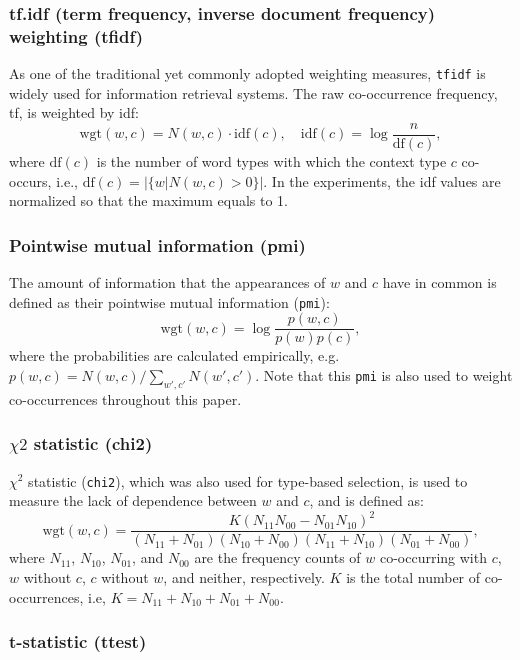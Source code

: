 \documentclass[english]{jnlp_1.4}
\begin{document}
\subsubsection{tf.idf (term frequency, inverse document frequency) weighting (tfidf)}

As one of the traditional yet commonly adopted weighting measures,
{\tt tfidf} is widely used for information retrieval systems.  The raw
co-occurrence frequency, tf, is weighted by idf:
\[
  \mbox{wgt}(w, c) = N(w, c) \cdot \mbox{idf}(c), \quad \mbox{idf}(c) = \log \frac{n}{\mbox{df}(c)},
\]
where $\mbox{df}(c)$ is the number of word types with which the
context type $c$ co-occurs, i.e., $\mbox{df}(c) = |\{ w | N(w, c) >
0\}|$. In the experiments, the idf values are normalized so that the
maximum equals to 1.

\subsubsection{Pointwise mutual information (pmi)}

The amount of information that the appearances of $w$ and $c$ have in
common is defined as their pointwise mutual information ({\tt pmi}):
\[
  \mbox{wgt}(w, c) = \log \frac{p(w,c)}{p(w)p(c)},
\]
where the probabilities are calculated empirically, e.g. $p(w, c) =
N(w, c) / \sum_{w', c'} N(w', c')$. Note that this {\tt pmi} is also
used to weight co-occurrences throughout this paper.

\subsubsection{$\chi2$ statistic (chi2)}

$\chi^2$ statistic ({\tt chi2}), which was also used for type-based
selection, is used to measure the lack of dependence between $w$ and
$c$, and is defined as:
\begin{equation}
  \mbox{wgt}(w, c) = \frac{K(N_{11}N_{00} - N_{01}N_{10})^2}{(N_{11}+N_{01})(N_{10}+N_{00})(N_{11}+N_{10})(N_{01}+N_{00})},
\end{equation}
where $N_{11}$, $N_{10}$, $N_{01}$, and $N_{00}$ are the frequency
counts of $w$ co-occurring with $c$, $w$ without $c$, $c$ without $w$,
and neither, respectively. $K$ is the total number of co-occurrences,
i.e, $K = N_{11}+N_{10}+N_{01}+N_{00}$.

\subsubsection{t-statistic (ttest)}
\end{document}

